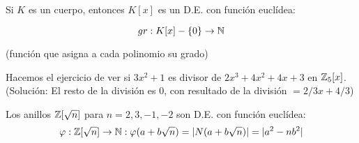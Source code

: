 \begin{ncor}
	Si $K$ es un cuerpo, entonces $K[x]$ es un D.E. con función euclídea:

	\[
	gr: K[x]-\{0\} \to \mathbb{N}
	\]

(función que asigna a cada polinomio su grado)
\end{ncor}

\begin{nota}
	Hacemos el ejercicio de ver si $3x^2 +1$ es divisor de $2x^3 + 4x^2 +4x +3$ en $\mathbb{Z} _5[x]$. (Solución: El resto de la división es 0, con resultado de la división $= 2/3 x + 4/3$)
\end{nota}


\begin{nth}
	Los anillos $\mathbb{Z}[\sqrt{n}]$ para $n=2,3,-1,-2$ son D.E. con función euclídea:
	\[
	\varphi: \mathbb{Z}[\sqrt{n}] \to \mathbb{N} : \varphi(a+b\sqrt{n}) = \lvert N(a+b\sqrt{n})\rvert = \lvert a^2 - nb^2\rvert
	\]


\end{nth}
